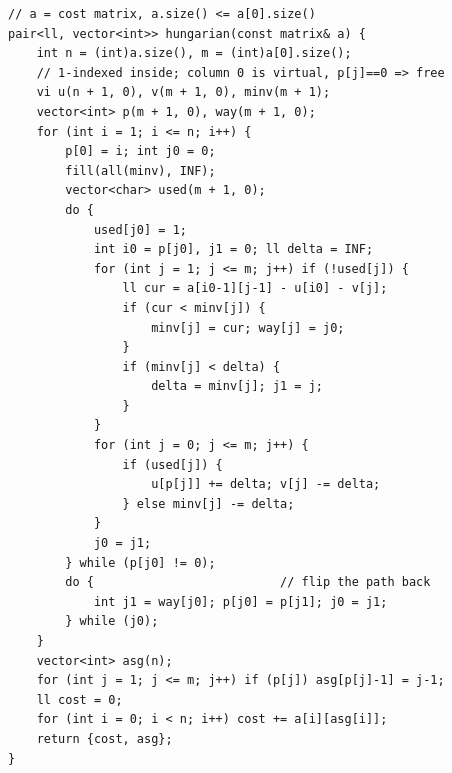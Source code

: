 \begin{lstlisting}
// a = cost matrix, a.size() <= a[0].size()
pair<ll, vector<int>> hungarian(const matrix& a) {
    int n = (int)a.size(), m = (int)a[0].size();
    // 1-indexed inside; column 0 is virtual, p[j]==0 => free
    vi u(n + 1, 0), v(m + 1, 0), minv(m + 1);
    vector<int> p(m + 1, 0), way(m + 1, 0);
    for (int i = 1; i <= n; i++) {
        p[0] = i; int j0 = 0;
        fill(all(minv), INF);
        vector<char> used(m + 1, 0);
        do {
            used[j0] = 1;
            int i0 = p[j0], j1 = 0; ll delta = INF;
            for (int j = 1; j <= m; j++) if (!used[j]) {
                ll cur = a[i0-1][j-1] - u[i0] - v[j];
                if (cur < minv[j]) {
                    minv[j] = cur; way[j] = j0;
                }
                if (minv[j] < delta) {
                    delta = minv[j]; j1 = j;
                }
            }
            for (int j = 0; j <= m; j++) {
                if (used[j]) {
                    u[p[j]] += delta; v[j] -= delta;
                } else minv[j] -= delta;
            }
            j0 = j1;
        } while (p[j0] != 0);
        do {                          // flip the path back
            int j1 = way[j0]; p[j0] = p[j1]; j0 = j1;
        } while (j0);
    }
    vector<int> asg(n);
    for (int j = 1; j <= m; j++) if (p[j]) asg[p[j]-1] = j-1;
    ll cost = 0;
    for (int i = 0; i < n; i++) cost += a[i][asg[i]];
    return {cost, asg};
}
\end{lstlisting}


